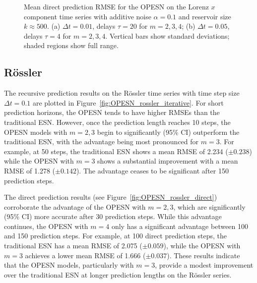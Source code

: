 \begin{figure}
    \caption{Mean direct prediction RMSE for the OPESN on the Lorenz $x$ component time series with additive noise $\alpha=0.1$ and reservoir size $k\approx500$. (a) $\Delta t = 0.01$, delays $\tau=20$ for $m=2,3,4$; (b) $\Delta t = 0.05$, delays $\tau=4$ for $m=2,3,4$. Vertical bars show standard deviations; shaded regions show full range.}
    \label{fig:OPESN_direct}
\end{figure}

\subsection{R\"ossler}

The recursive prediction results on the R\"ossler time series with time step size $\Delta t=0.1$ are plotted in Figure~\ref{fig:OPESN_rossler_iterative}.
For short prediction horizons, the OPESN tends to have higher RMSEs than the traditional ESN. However, once the prediction length reaches 10 steps, the OPESN models with $m=2,3$ begin to significantly (95\% CI) outperform the traditional ESN, with the advantage being most pronounced for $m=3$. For example, at 50 steps, the traditional ESN shows a mean RMSE of 2.234 ($\pm 0.238$) while the OPESN with $m=3$ shows a substantial improvement with a mean RMSE of 1.278 ($\pm 0.142$). The advantage ceases to be significant after 150 prediction steps.

The direct prediction results (see Figure~\ref{fig:OPESN_rossler_direct}) corroborate the advantage of the OPESN with $m=2,3$, which are significantly (95\% CI) more accurate after 30 prediction steps. While this advantage continues, the OPESN with $m=4$ only has a significant advantage between 100 and 150 prediction steps. For example, at 100 direct prediction steps, the traditional ESN has a mean RMSE of 2.075 ($\pm 0.059$), while the OPESN with $m=3$ achieves a lower mean RMSE of 1.666 ($\pm 0.037$). These results indicate that the OPESN models, particularly with $m=3$, provide a modest improvement over the traditional ESN at longer prediction lengths on the R\"ossler series.


